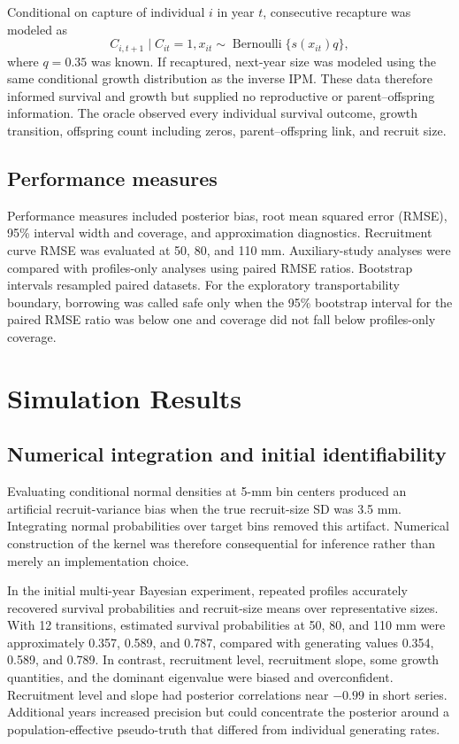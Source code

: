 \documentclass[11pt]{article}
\begin{document}
Conditional on capture of individual \(i\) in year \(t\), consecutive
recapture was modeled as
\begin{equation}
  C_{i,t+1}\mid C_{it}=1,x_{it}
  \sim \operatorname{Bernoulli}\{s(x_{it})q\},
\end{equation}
where \(q=0.35\) was known. If recaptured, next-year size was modeled using
the same conditional growth distribution as the inverse IPM. These data
therefore informed survival and growth but supplied no reproductive or
parent--offspring information. The oracle observed every individual survival
outcome, growth transition, offspring count including zeros, parent--offspring
link, and recruit size.

\subsection{Performance measures}

Performance measures included posterior bias, root mean squared error (RMSE),
95\% interval width and coverage, and approximation diagnostics. Recruitment
curve RMSE was evaluated at 50, 80, and 110 mm. Auxiliary-study analyses were
compared with profiles-only analyses using paired RMSE ratios. Bootstrap
intervals resampled paired datasets. For the exploratory transportability
boundary, borrowing was called safe only when the 95\% bootstrap interval for
the paired RMSE ratio was below one and coverage did not fall below
profiles-only coverage.

\section{Simulation Results}

\subsection{Numerical integration and initial identifiability}

Evaluating conditional normal densities at 5-mm bin centers produced an
artificial recruit-variance bias when the true recruit-size SD was 3.5 mm.
Integrating normal probabilities over target bins removed this artifact.
Numerical construction of the kernel was therefore consequential for
inference rather than merely an implementation choice.

In the initial multi-year Bayesian experiment, repeated profiles accurately
recovered survival probabilities and recruit-size means over representative
sizes. With 12 transitions, estimated survival probabilities at 50, 80, and
110 mm were approximately 0.357, 0.589, and 0.787, compared with generating
values 0.354, 0.589, and 0.789. In contrast, recruitment level, recruitment
slope, some growth quantities, and the dominant eigenvalue were biased and
overconfident. Recruitment level and slope had posterior correlations near
\(-0.99\) in short series. Additional years increased precision but could
concentrate the posterior around a population-effective pseudo-truth that
differed from individual generating rates.
\end{document}
